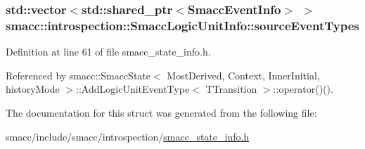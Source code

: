 \subsubsection[{\texorpdfstring{source\+Event\+Types}{sourceEventTypes}}]{\setlength{\rightskip}{0pt plus 5cm}std\+::vector$<$std\+::shared\+\_\+ptr$<${\bf Smacc\+Event\+Info}$>$ $>$ smacc\+::introspection\+::\+Smacc\+Logic\+Unit\+Info\+::source\+Event\+Types}\hypertarget{structsmacc_1_1introspection_1_1SmaccLogicUnitInfo_add386e83d888a7819c0132a75942fa5d}{}\label{structsmacc_1_1introspection_1_1SmaccLogicUnitInfo_add386e83d888a7819c0132a75942fa5d}


Definition at line 61 of file smacc\+\_\+state\+\_\+info.\+h.



Referenced by smacc\+::\+Smacc\+State$<$ Most\+Derived, Context, Inner\+Initial, history\+Mode $>$\+::\+Add\+Logic\+Unit\+Event\+Type$<$ T\+Transition $>$\+::operator()().



The documentation for this struct was generated from the following file\+:\begin{DoxyCompactItemize}
\item 
smacc/include/smacc/introspection/\hyperlink{smacc__state__info_8h}{smacc\+\_\+state\+\_\+info.\+h}\end{DoxyCompactItemize}
